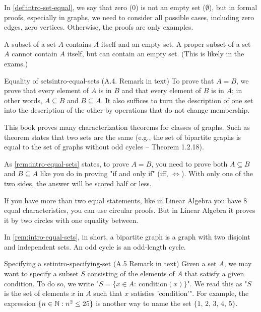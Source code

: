 \documentclass[../src/handouts/main.tex]{subfiles}
\begin{document}
In \cref{def:intro-set-equal}, we say that zero (0) is not an empty set ($\emptyset$), but in formal proofs, especially in graphs, we need to consider all possible cases, including zero edges, zero vertices. Otherwise, the proofs are only examples.

A subset of a set $A$ contains $A$ itself and an empty set. A proper subset of a set $A$ cannot contain $A$ itself, but can contain an empty set. (This is likely in the exams.)

\begin{remark}{Equality of sets}{intro-equal-sets}
  (A.4. Remark in text)
  To prove that $A = B$, we prove that every element of $A$ is in $B$ and that every element of $B$ is in $A$; in other words, $A \subseteq B$ and $B \subseteq A$. It also suffices to turn the description of one set into the description of the other by operations that do not change membership.

  This book proves many characterization theorems for classes of graphs. Such as theorem states that two sets are the same (e.g., the set of bipartite graphs is equal to the set of graphs without odd cycles -- Theorem 1.2.18).
\end{remark}

As \cref{rem:intro-equal-sets} states, to prove $A = B$, you need to prove both $A \subseteq B$ and $B \subseteq A$ like you do in proving "if and only if" (iff, $\iff$). With only one of the two sides, the answer will be scored half or less.

If you have more than two equal statements, like in Linear Algebra you have 8 equal characteristics, you can use circular proofs. But in Linear Algebra it proves it by two circles with one equality between.

In \cref{rem:intro-equal-sets}, in short, a bipartite graph is a graph with two disjoint and independent sets. An odd cycle is an odd-length cycle.

\begin{remark}{Specifying a set}{intro-specifying-set}
  (A.5 Remark in text)
  Given a set $A$, we may want to specify a subset $S$ consisting of the elements of $A$ that satisfy a given condition. To do so, we write "$S = \{ x \in A:\ \text{condition}(x)\}$". We read this as "$S$ is the set of elements $x$ in $A$ such that $x$ satisfies 'condition'". For example, the expression $\{ n \in \mathbb{N} : n^2 \leq 25 \}$ is another way to name the set $\{ 1,\, 2,\, 3,\, 4,\, 5 \}$.
\end{remark}
\end{document}
